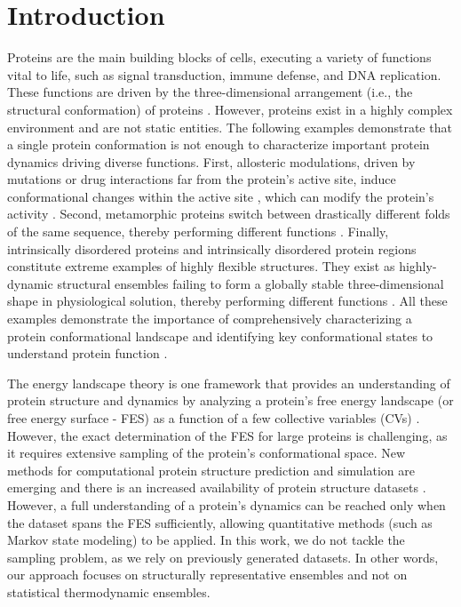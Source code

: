 \documentclass[unnumsec,webpdf,contemporary,large,numsquare]{oup-authoring-template}%
\theoremstyle{thmstyleone}%
\theoremstyle{thmstyletwo}%
\theoremstyle{thmstylethree}%
\begin{document}
\maketitle
\section{Introduction}

Proteins are the main building blocks of cells, executing a variety of functions vital to life, such as signal transduction, immune defense, and DNA replication. These functions are driven by the three-dimensional arrangement (i.e., the structural conformation) of proteins \citep{kessel__2018}. However, proteins exist in a highly complex environment and are not static entities. The following examples demonstrate that a single protein conformation is not enough to characterize important protein dynamics driving diverse functions. First, allosteric modulations, driven by mutations or drug interactions far from the protein's active site, induce conformational changes within the active site \citep{nussinov_allostery_2013}, which can modify the protein’s activity \citep{todd_plasticity_2002, tsou_active_1998, weng_study_2011}. Second, metamorphic proteins switch between drastically different folds of the same sequence, thereby performing different functions \citep{dishman_unfolding_2018, dishman_design_2022, lella_metamorphic_2017, kim_functional_2021}. Finally, intrinsically disordered proteins and intrinsically disordered protein regions constitute extreme examples of highly flexible structures. They exist as highly-dynamic structural ensembles failing to form a globally stable three-dimensional shape in physiological solution, thereby performing different functions \citep{shehu_multiscale_2009, uversky_p53_2016}. All these examples demonstrate the importance of comprehensively characterizing a protein conformational landscape and identifying key conformational states to understand protein function \citep{henzler-wildman_dynamic_2007}. 

The energy landscape theory is one framework that provides an understanding of protein structure and dynamics by analyzing a protein’s free energy landscape (or free energy surface - FES) as a function of a few collective variables (CVs) \citep{frauenfelder_energy_1991, kumar_folding_2000, onuchic_theory_1997}. However, the exact determination of the FES for large proteins is challenging, as it requires extensive sampling of the protein's conformational space. New methods for computational protein structure prediction and simulation are emerging and there is an increased availability of protein structure datasets \citep{jumper_highly_2021, baek_accurate_2021, lin_evolutionary-scale_2022, barhaghi_py-mcmd_2022, abraham_gromacs_2015, eastman_openmm_2013, husic_coarse_2020, henin_enhanced_2022}. However, a full understanding of a protein's dynamics can be reached only when the dataset spans the FES sufficiently, allowing quantitative methods (such as Markov state modeling) to be applied. In this work, we do not tackle the sampling problem, as we rely on previously generated datasets. In other words, our approach focuses on structurally representative ensembles and not on statistical thermodynamic ensembles. 
\end{document}
